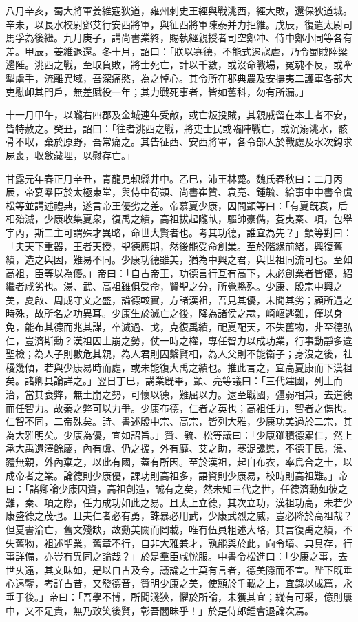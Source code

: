 \begin{pinyinscope}
八月辛亥，蜀大將軍姜維寇狄道，雍州刺史王經與戰洮西，經大敗，還保狄道城。辛未，以長水校尉鄧艾行安西將軍，與征西將軍陳泰并力拒維。戊辰，復遣太尉司馬孚為後繼。九月庚子，講尚書業終，賜執經親授者司空鄭冲、侍中鄭小同等各有差。甲辰，姜維退還。冬十月，詔曰：「朕以寡德，不能式遏寇虐，乃令蜀賊陸梁邊陲。洮西之戰，至取負敗，將士死亡，計以千數，或沒命戰場，冤魂不反，或牽掣虜手，流離異域，吾深痛愍，為之悼心。其令所在郡典農及安撫夷二護軍各部大吏慰卹其門戶，無差賦役一年；其力戰死事者，皆如舊科，勿有所漏。」

十一月甲午，以隴右四郡及金城連年受敵，或亡叛投賊，其親戚留在本土者不安，皆特赦之。癸丑，詔曰：「往者洮西之戰，將吏士民或臨陣戰亡，或沉溺洮水，骸骨不収，棄於原野，吾常痛之。其告征西、安西將軍，各令部人於戰處及水次鈎求屍喪，収斂藏埋，以慰存亡。」

甘露元年春正月辛丑，青龍見軹縣井中。乙巳，沛王林薨。魏氏春秋曰：二月丙辰，帝宴羣臣於太極東堂，與侍中荀顗、尚書崔贊、袁亮、鍾毓、給事中中書令虞松等並講述禮典，遂言帝王優劣之差。帝慕夏少康，因問顗等曰：「有夏旣衰，后相殆滅，少康收集夏衆，復禹之績，高祖拔起隴畒，驅帥豪儁，芟夷秦、項，包舉宇內，斯二主可謂殊才異略，命世大賢者也。考其功德，誰宜為先？」顗等對曰：「夫天下重器，王者天授，聖德應期，然後能受命創業。至於階緣前緒，興復舊績，造之與因，難易不同。少康功德雖美，猶為中興之君，與世祖同流可也。至如高祖，臣等以為優。」帝曰：「自古帝王，功德言行互有高下，未必創業者皆優，紹繼者咸劣也。湯、武、高祖雖俱受命，賢聖之分，所覺縣殊。少康、殷宗中興之美，夏啟、周成守文之盛，論德較實，方諸漢祖，吾見其優，未聞其劣；顧所遇之時殊，故所名之功異耳。少康生於滅亡之後，降為諸侯之隷，崎嶇逃難，僅以身免，能布其德而兆其謀，卒滅過、戈，克復禹績，祀夏配天，不失舊物，非至德弘仁，豈濟斯勳？漢祖因土崩之勢，仗一時之權，專任智力以成功業，行事動靜多違聖檢；為人子則數危其親，為人君則囚繫賢相，為人父則不能衞子；身沒之後，社稷幾傾，若與少康易時而處，或未能復大禹之績也。推此言之，宜高夏康而下漢祖矣。諸卿具論詳之。」翌日丁巳，講業旣畢，顗、亮等議曰：「三代建國，列土而治，當其衰弊，無土崩之勢，可懷以德，難屈以力。逮至戰國，彊弱相兼，去道德而任智力。故秦之弊可以力爭。少康布德，仁者之英也；高祖任力，智者之儁也。仁智不同，二帝殊矣。詩、書述殷中宗、高宗，皆列大雅，少康功美過於二宗，其為大雅明矣。少康為優，宜如詔旨。」贊、毓、松等議曰：「少康雖積德累仁，然上承大禹遺澤餘慶，內有虞、仍之援，外有靡、艾之助，寒浞讒慝，不德于民，澆、豷無親，外內棄之，以此有國，蓋有所因。至於漢祖，起自布衣，率烏合之士，以成帝者之業。論德則少康優，課功則高祖多，語資則少康易，校時則高祖難。」帝曰：「諸卿論少康因資，高祖創造，誠有之矣，然未知三代之世，任德濟勳如彼之難，秦、項之際，任力成功如此之易。且太上立德，其次立功，漢祖功高，未若少康盛德之茂也。且夫仁者必有勇，誅暴必用武，少康武烈之威，豈必降於高祖哉？但夏書淪亡，舊文殘缺，故勳美闕而罔載，唯有伍員粗述大略，其言復禹之績，不失舊物，祖述聖業，舊章不行，自非大雅兼才，孰能與於此，向令墳、典具存，行事詳備，亦豈有異同之論哉？」於是羣臣咸恱服。中書令松進曰：「少康之事，去世乆遠，其文昧如，是以自古及今，議論之士莫有言者，德美隱而不宣。陛下旣垂心遠鑒，考詳古昔，又發德音，贊明少康之美，使顯於千載之上，宜錄以成篇，永垂于後。」帝曰：「吾學不博，所聞淺狹，懼於所論，未獲其宜；縱有可采，億則屢中，又不足貴，無乃致笑後賢，彰吾闇昧乎！」於是侍郎鍾會退論次焉。


\end{pinyinscope}
